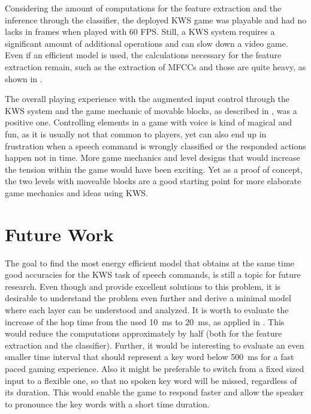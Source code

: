 Considering the amount of computations for the feature extraction and the inference through the classifier, the deployed KWS game was playable and had no lacks in frames when played with 60 FPS.
Still, a KWS system requires a significant amount of additional operations and can slow down a video game.
Even if an efficient model is used, the calculations necessary for the feature extraction remain, such as the extraction of MFCCs and those are quite heavy, as shown in .

The overall playing experience with the augmented input control through the KWS system and the game mechanic of movable blocks, as described in , was a positive one.
Controlling elements in a game with voice is kind of magical and fun, as it is usually not that common to players, yet can also end up in frustration when a speech command is wrongly classified or the responded actions happen not in time.
More game mechanics and level designs that would increase the tension within the game would have been exciting.
Yet as a proof of concept, the two levels with moveable blocks are a good starting point for more elaborate game mechanics and ideas using KWS.



\section{Future Work}
The goal to find the most energy efficient model that obtains at the same time good accuracies for the KWS task of speech commands, is still a topic for future research.
Even though \cite{Zhang2017} and \cite{Peter2020} provide excellent solutions to this problem, it is desirable to understand the problem even further and derive a minimal model where each layer can be understood and analyzed.
It is worth to evaluate the increase of the hop time from the used \SI{10}{\milli\second} to \SI{20}{\milli\second}, as applied in \cite{Peter2020}.
This would reduce the computations approximately by half (both for the feature extraction and the classifier).
Further, it would be interesting to evaluate an even smaller time interval that should represent a key word below \SI{500}{\milli\second} for a fast paced gaming experience.
Also it might be preferable to switch from a fixed sized input to a flexible one, so that no spoken key word will be missed, regardless of its duration.
This would enable the game to respond faster and allow the speaker to pronounce the key words with a short time duration.

